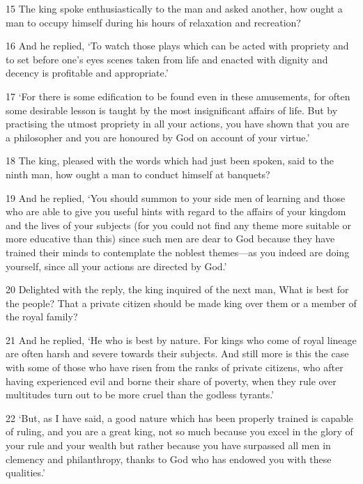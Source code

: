 \par 15 The king spoke enthusiastically to the man and asked another, how ought a man to occupy himself during his hours of relaxation and recreation?

\par 16 And he replied, ‘To watch those plays which can be acted with propriety and to set before one's eyes scenes taken from life and enacted with dignity and decency is profitable and appropriate.’

\par 17 ‘For there is some edification to be found even in these amusements, for often some desirable lesson is taught by the most insignificant affairs of life. But by practising the utmost propriety in all your actions, you have shown that you are a philosopher and you are honoured by God on account of your virtue.’

\par 18 The king, pleased with the words which had just been spoken, said to the ninth man, how ought a man to conduct himself at banquets?

\par 19 And he replied, ‘You should summon to your side men of learning and those who are able to give you useful hints with regard to the affairs of your kingdom and the lives of your subjects (for you could not find any theme more suitable or more educative than this) since such men are dear to God because they have trained their minds to contemplate the noblest themes—as you indeed are doing yourself, since all your actions are directed by God.’

\par 20 Delighted with the reply, the king inquired of the next man, What is best for the people? That a private citizen should be made king over them or a member of the royal family?

\par 21 And he replied, ‘He who is best by nature. For kings who come of royal lineage are often harsh and severe towards their subjects. And still more is this the case with some of those who have risen from the ranks of private citizens, who after having experienced evil and borne their share of poverty, when they rule over multitudes turn out to be more cruel than the godless tyrants.’

\par 22 ‘But, as I have said, a good nature which has been properly trained is capable of ruling, and you are a great king, not so much because you excel in the glory of your rule and your wealth but rather because you have surpassed all men in clemency and philanthropy, thanks to God who has endowed you with these qualities.’

